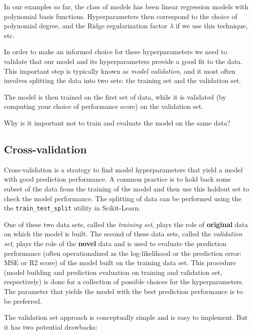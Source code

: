 \documentclass[%
oneside,                 %
final,                   %
10pt]{article}
\newenvironment{question_mdfboxadmon}[1][]{
\begin{question_mdfboxmdframed}[frametitle=#1]
}
{
\end{question_mdfboxmdframed}
}
\begin{document}
\noindent
In our examples so far, the class of models has been linear regression models with polynomial basis functions. Hyperparameters then correspond to the choice of polynomial degree, and the Ridge regularization factor $\lambda$ if we use this technique, etc. 

In order to make an informed choice for these hyperparameters we need to validate that our model and its hyperparameters provide a good fit to the data. This important step is typically known as \emph{model validation}, and it most often involves splitting the data into two sets: the training set and the validation set. 

The model is then trained on the first set of data, while it is validated (by computing your choice of performance score) on the validation set.


\begin{question_mdfboxadmon}[Question]
Why is it important not to train and evaluate the model on the same data?
\end{question_mdfboxadmon} %




\subsection{Cross-validation}

Cross-validation is a strategy to find model hyperparameters that yield a model with good prediction
performance. A common practice is to hold back some subset of the data from the training of the model and then use this holdout set to check the model performance. The splitting of data can be performed using the the \Verb!train_test_split! utility in Scikit-Learn.

One of these two data sets, called the 
\emph{training set}, plays the role of \textbf{original} data on which the model is
built. The second of these data sets, called the \emph{validation set}, plays the
role of the \textbf{novel} data and is used to evaluate the prediction
performance (often operationalized as the log-likelihood or the
prediction error: MSE or R2 score) of the model built on the training data set. This
procedure (model building and prediction evaluation on training and
validation set, respectively) is done for a collection of possible choices for the hyperparameters. The parameter that yields the model with
the best prediction performance is to be preferred. 

The validation set approach is conceptually simple and is easy to implement. But it has two potential drawbacks:
\end{document}
